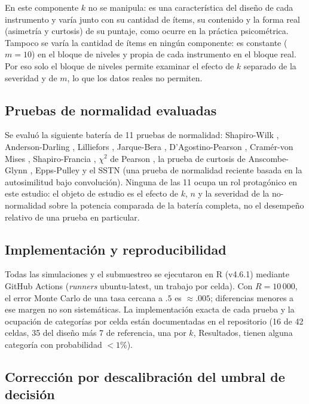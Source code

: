 \documentclass[man,mask,donotrepeattitle,floatsintext]{apa7}
\begin{document}
En este componente $k$ no se manipula: es una característica del diseño de cada instrumento y varía junto con su cantidad de ítems, su contenido y la forma real (asimetría y curtosis) de su puntaje, como ocurre en la práctica psicométrica. Tampoco se varía la cantidad de ítems en ningún componente: es constante ($m=10$) en el bloque de niveles y propia de cada instrumento en el bloque real. Por eso solo el bloque de niveles permite examinar el efecto de $k$ separado de la severidad y de $m$, lo que los datos reales no permiten.

\subsection{Pruebas de normalidad evaluadas}
\label{sec:tests}

Se evaluó la siguiente batería de 11 pruebas de normalidad: Shapiro-Wilk \parencite{shapirowilk1965}, Anderson-Darling \parencite{andersondarling1954}, Lilliefors \parencite{lilliefors1967}, Jarque-Bera \parencite{jarquebera1980}, D'Agostino-Pearson \parencite{dagostinopearson1973}, Cramér-von Mises \parencite{csorgofaraway1996}, Shapiro-Francia \parencite{shapirofrancia1972}, $\chi^2$ de Pearson \parencite{pearson1900}, la prueba de curtosis de Anscombe-Glynn \parencite{anscombeglynn1983}, Epps-Pulley \parencite{eppspulley1983} y el SSTN \parencite{anaratschwender2026} (una prueba de normalidad reciente basada en la autosimilitud bajo convolución). Ninguna de las 11 ocupa un rol protagónico en este estudio: el objeto de estudio es el efecto de $k$, $n$ y la severidad de la no-normalidad sobre la potencia comparada de la batería completa, no el desempeño relativo de una prueba en particular.
\subsection{Implementación y reproducibilidad}
\label{sec:implementation}

Todas las simulaciones y el submuestreo se ejecutaron en R (v4.6.1) mediante GitHub Actions (\emph{runners} ubuntu-latest, un trabajo por celda). Con $R=10\,000$, el error Monte Carlo de una tasa cercana a $.5$ es $\approx.005$; diferencias menores a ese margen no son sistemáticas. La implementación exacta de cada prueba y la ocupación de categorías por celda están documentadas en el repositorio (16 de 42 celdas, 35 del diseño más 7 de referencia, una por $k$, Resultados, tienen alguna categoría con probabilidad $<1\%$).

\subsection{Corrección por descalibración del umbral de decisión}
\label{sec:correccion}
\end{document}
